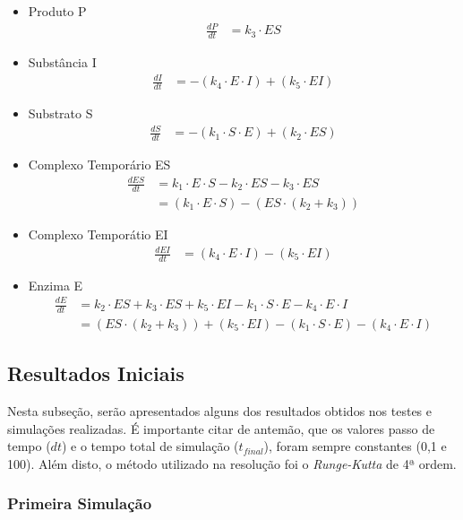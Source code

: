 \documentclass[a4paper, 12pt]{article}
\begin{document}
\begin{itemize}
    \item Produto P
    \begin{align*}
        \frac{dP}{dt} & = k_3 \cdot ES
    \end{align*}
    \item Substância I
    \begin{align*}
        \frac{dI}{dt} & = - (k_4 \cdot E \cdot I) + (k_5 \cdot EI)
    \end{align*}
    \item Substrato S
    \begin{align*}
        \frac{dS}{dt} & = - (k_1 \cdot S \cdot E) + (k_2 \cdot ES)
    \end{align*}
    \item Complexo Temporário ES
    \begin{align*}
        \frac{dES}{dt} & = k_1 \cdot E \cdot S - k_2 \cdot ES - k_3 \cdot ES\\
        & = (k_1 \cdot E \cdot S) - (ES \cdot(k_2 + k_3))
    \end{align*}
    \item Complexo Temporátio EI
    \begin{align*}
        \frac{dEI}{dt} & = (k_4 \cdot E \cdot I) - (k_5 \cdot EI)
    \end{align*}
    \item Enzima E
    \begin{align*}
        \frac{dE}{dt} & = k_2 \cdot ES + k_3 \cdot ES + k_5 \cdot EI - k_1 \cdot S \cdot E - k_4 \cdot E \cdot I\\
        & = (ES \cdot (k_2 + k_3)) + (k_5 \cdot EI) - (k_1 \cdot S \cdot E) - (k_4 \cdot E \cdot I)
    \end{align*}
\end{itemize}

\subsection*{Resultados Iniciais}

Nesta subseção, serão apresentados alguns dos resultados obtidos nos testes e simulações realizadas. É importante citar de antemão, que os valores passo de tempo (\(dt\)) e o tempo total de simulação (\(t_{final}\)), foram sempre constantes (0,1 e 100). Além disto, o método utilizado na resolução foi o \emph{Runge-Kutta} de 4ª ordem.

\subsubsection*{Primeira Simulação}
\end{document}

